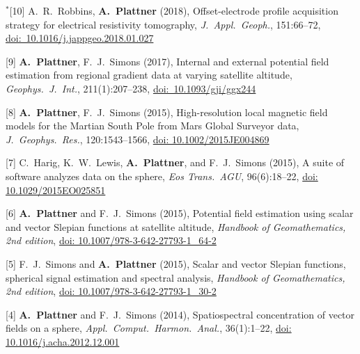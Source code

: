 \documentclass[10pt]{article}
\begin{document}
\spcp
\hspace{-0.835cm}$^*$[10] A.~R.~Robbins, \textbf{A.~Plattner} (2018),
Offset-electrode profile acquisition strategy for
electrical resistivity tomography,
\emph{J.~Appl.~Geoph.}, 151:66--72, \href{https://www.sciencedirect.com/science/article/pii/S0926985117308376?via%3Dihub}{doi:~10.1016/j.jappgeo.2018.01.027} 


\spcp
\hspace{-0.5cm}[9] \textbf{A.~Plattner}, F.~J.~Simons (2017),
Internal and external potential field estimation
from regional gradient data at varying satellite altitude,
\emph{Geophys.~J.~Int.}, 211(1):207--238, \href{https://academic.oup.com/gji/article-lookup/doi/10.1093/gji/ggx244}{doi:~10.1093/gji/ggx244} 

\spcp
\hspace{-0.5cm}[8] \textbf{A.~Plattner}, F.~J.~Simons (2015),
High-resolution local magnetic field models for the
Martian South Pole
from Mars Global Surveyor data,
\emph{J.~Geophys.~Res.}, 120:1543--1566,
\href{http://onlinelibrary.wiley.com/doi/10.1002/2015JE004869/abstract}{doi: 10.1002/2015JE004869}

\spcp
\hspace{-0.5cm}[7] C.~Harig, K.~W.~Lewis, \textbf{A.~Plattner}, and F.~J.~Simons (2015),
A suite of software analyzes data on the sphere,
\emph{Eos Trans.~AGU}, 96(6):18--22,
\href{https://eos.org/project-updates/a-suite-of-software-analyzes-data-on-the-sphere-2}{doi: 10.1029/2015EO025851}

\spcp
\hspace{-0.5cm}[6] \textbf{A.~Plattner} and F.~J.~Simons (2015),
Potential field estimation using scalar and vector Slepian functions at satellite altitude,
\emph{Handbook of Geomathematics, 2nd edition},
\href{https://link.springer.com/referenceworkentry/10.1007\%2F978-3-642-27793-1_64-2}{doi: 10.1007/978-3-642-27793-1\_64-2}

\spcp
\hspace{-0.5cm}[5] F.~J.~Simons and \textbf{A.~Plattner} (2015),
Scalar and vector Slepian functions, spherical signal estimation and spectral analysis,
\emph{Handbook of Geomathematics, 2nd edition},
\href{https://link.springer.com/referenceworkentry/10.1007\%2F978-3-642-27793-1_30-2}{doi: 10.1007/978-3-642-27793-1\_30-2}

\spcp
\hspace{-0.5cm}[4] \textbf{A.~Plattner} and F.~J.~Simons (2014),
Spatiospectral concentration of vector fields on a sphere,
\emph{Appl.~Comput.~Harmon.~Anal.}, 36(1):1--22, 
\href{http://www.sciencedirect.com/science/article/pii/S106352031300002X?via\%3Dihub}{doi: 10.1016/j.acha.2012.12.001}
\end{document}
